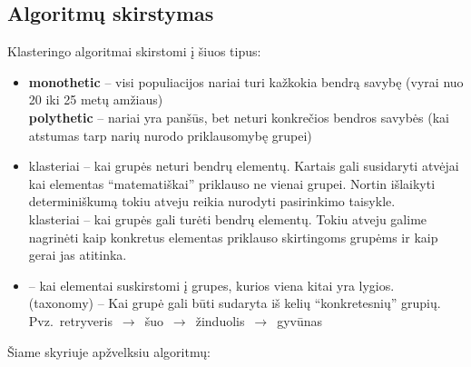 \documentclass{VUMIFInfKursinis}
\begin{document}
	\subsection{Algoritmų skirstymas}
	Klasteringo algoritmai skirstomi į šiuos tipus:
	\begin{itemize}
		\item \textbf{monothetic }– visi populiacijos nariai turi kažkokia bendrą savybę (vyrai nuo 20 iki 25 metų amžiaus)
			\\\textbf{polythetic }– nariai yra panšūs, bet neturi konkrečios bendros savybės (kai atstumas tarp narių nurodo priklausomybę grupei)
		\item {} klasteriai – kai grupės neturi bendrų elementų. Kartais gali susidaryti atvėjai kai elementas “matematiškai” priklauso ne vienai grupei. Nortin išlaikyti determiniškumą tokiu atveju reikia nurodyti pasirinkimo taisykle.
			\\ klasteriai – kai grupės gali turėti bendrų elementų. Tokiu atveju galime nagrinėti kaip konkretus elementas priklauso skirtingoms grupėms ir kaip gerai jas atitinka.
		\item {} – kai elementai suskirstomi į grupes, kurios viena kitai yra lygios.
			\\ (taxonomy) – Kai grupė gali būti sudaryta iš kelių “konkretesnių” grupių. Pvz.\ retryveris $\,\to\,$ šuo $\,\to\,$ žinduolis $\,\to\,$ gyvūnas
	\end{itemize}
	Šiame skyriuje apžvelksiu algoritmų:

	{}
\end{document}

